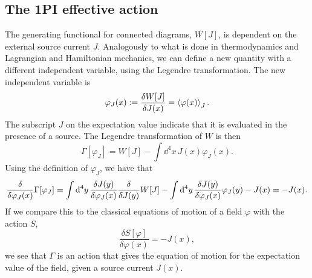 \subsection*{The 1PI effective action}

\label{section: effective action}
The generating functional for connected diagrams, $W[J]$, is dependent on the external source current $J$.
Analogously to what is done in thermodynamics and Lagrangian and Hamiltonian mechanics, we can define a new quantity with a different independent variable, using the Legendre transformation.
The new independent variable is 
\begin{equation}
    \varphi_J(x) := \frac{\delta W[J]}{\delta J(x)} = \ex{\varphi(x)}_J.
\end{equation}
The subscript $J$ on the expectation value indicate that it is evaluated in the presence of a source.
The Legendre transformation of $W$ is then
\begin{equation}
    \label{1PI effective action}
    \Gamma[\varphi_J]
    = W[J] - \int \dd^4 x \, J(x) \varphi_J(x).
\end{equation}
Using the definition of $\varphi_J$, we have that
\begin{equation}
    \label{effective equation of motion}
    \fdv{\varphi_J(x)} \Gamma[\varphi_J]
    = \int \dd^4 y \, \fdv{J(y)}{\varphi_J(x)} \fdv{J(y)} W[J]
    - \int \dd^4 y \, \fdv{J(y)}{\varphi_J(x)} \varphi_J(y)
    - J(x)
    = - J(x).
\end{equation}
If we compare this to the classical equations of motion of a field $\varphi$ with the action $S$,
\begin{equation}
    \frac{\delta S[\varphi]}{\delta \varphi(x)} = -J(x),
\end{equation}
we see that $\Gamma$ is an action that gives the equation of motion for the expectation value of the field, given a source current $J(x)$.

